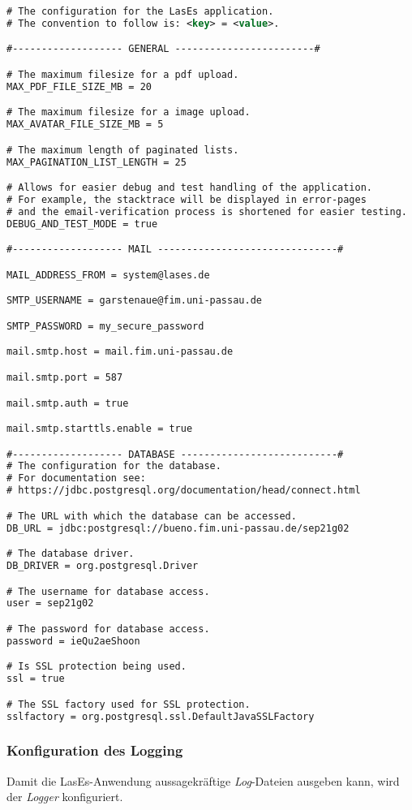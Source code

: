 \begin{lstlisting}[language=XML, caption = Die Anwendungskonfiguration \emph{config.properties}]
# The configuration for the LasEs application.
# The convention to follow is: <key> = <value>.

#------------------- GENERAL ------------------------#

# The maximum filesize for a pdf upload.
MAX_PDF_FILE_SIZE_MB = 20

# The maximum filesize for a image upload.
MAX_AVATAR_FILE_SIZE_MB = 5

# The maximum length of paginated lists.
MAX_PAGINATION_LIST_LENGTH = 25

# Allows for easier debug and test handling of the application.
# For example, the stacktrace will be displayed in error-pages
# and the email-verification process is shortened for easier testing.
DEBUG_AND_TEST_MODE = true

#------------------- MAIL -------------------------------#

MAIL_ADDRESS_FROM = system@lases.de

SMTP_USERNAME = garstenaue@fim.uni-passau.de

SMTP_PASSWORD = my_secure_password

mail.smtp.host = mail.fim.uni-passau.de

mail.smtp.port = 587

mail.smtp.auth = true

mail.smtp.starttls.enable = true

#------------------- DATABASE ---------------------------#
# The configuration for the database.
# For documentation see:
# https://jdbc.postgresql.org/documentation/head/connect.html

# The URL with which the database can be accessed.
DB_URL = jdbc:postgresql://bueno.fim.uni-passau.de/sep21g02

# The database driver.
DB_DRIVER = org.postgresql.Driver

# The username for database access.
user = sep21g02

# The password for database access.
password = ieQu2aeShoon

# Is SSL protection being used.
ssl = true

# The SSL factory used for SSL protection.
sslfactory = org.postgresql.ssl.DefaultJavaSSLFactory
\end{lstlisting}


\subsubsection{Konfiguration des Logging}
Damit die LasEs-Anwendung aussagekräftige \emph{Log}-Dateien ausgeben kann,
wird der \emph{Logger} konfiguriert.

